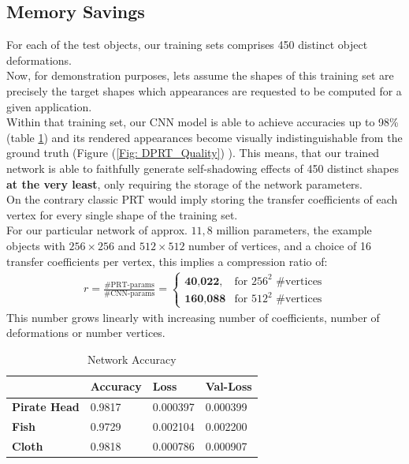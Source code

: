 \subsection*{Memory Savings}
For each of the test objects, our training sets comprises 450 distinct object deformations. \\
Now, for demonstration purposes, lets assume the shapes of this training set are precisely the target shapes which appearances are requested to be computed for a given application.
\\
Within that training set, our CNN model is able to achieve accuracies up to 98\% (table \ref{Table: NN_Accuracy}) and its rendered appearances become visually indistinguishable from the ground truth (Figure (\ref{Fig: DPRT_Quality}) ). 
This means, that our trained network is able to faithfully generate self-shadowing effects of 450 distinct shapes \textbf{at the very least}, only requiring the storage of the network parameters.
\\ 
On the contrary classic PRT would imply storing the transfer coefficients of each vertex for every single shape of the training set.
\\ 
For our particular network of approx. $11,8$ million parameters,  the example objects with $256 \times 256$ and $512 \times 512$ number of vertices, and  a choice of 16 transfer coefficients per vertex, this implies a compression ratio of: 
\begin{align*}
r = \frac{\text{\# PRT-params}}{\text{\# CNN-params}}  = 
\begin{cases}
\textbf{40,022} , & \mbox{for } 256^2 \mbox{ \#vertices} \\
\textbf{160,088} & \mbox{for } 512^2 \mbox{ \#vertices}
\end{cases}
\end{align*}
This number grows linearly with increasing number of coefficients, number of deformations or number vertices. 
\begin{table}[H]
\begin{tabular}{|l|l|l|l|l|}
\hline
\textbf{}            & \textbf{Accuracy} & \textbf{Loss} & \multicolumn{2}{l|}{\textbf{Val-Loss}} \\ \hline
\textbf{Pirate Head} & 0.9817            & 0.000397            & \multicolumn{2}{l|}{0.000399}                 \\ \hline
\textbf{Fish}        & 0.9729            & 0.002104            & \multicolumn{2}{l|}{0.002200}                 \\ \hline
\textbf{Cloth}       & 0.9818            & 0.000786            & \multicolumn{2}{l|}{0.000907}                 \\ \hline
\end{tabular}
\caption{Network Accuracy}
\label{Table: NN_Accuracy}
\end{table}
